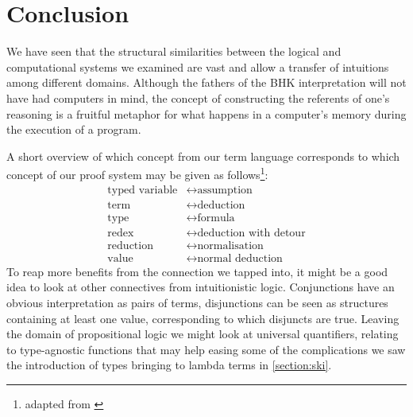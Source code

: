 \chapter{Conclusion}

We have seen that the structural similarities between the logical and
computational systems we examined are vast and allow a transfer of intuitions
among different domains. Although the fathers of the BHK interpretation will not
have had computers in mind, the concept of constructing the referents of one's
reasoning is a fruitful metaphor for what happens in a computer's memory during
the execution of a program.

A short overview of which concept from our term language corresponds to which
concept of our proof system may be given as follows\footnote{adapted from
\cite[67]{lectures}}:
\begin{align*}
\mbox{typed variable} &\leftrightarrow \mbox{assumption} \\
\mbox{term} &\leftrightarrow \mbox{deduction} \\
\mbox{type} &\leftrightarrow \mbox{formula} \\
\mbox{redex} &\leftrightarrow \mbox{deduction with detour} \\
\mbox{reduction} &\leftrightarrow \mbox{normalisation} \\
\mbox{value} &\leftrightarrow \mbox{normal deduction}
\end{align*}
To reap more benefits from the connection we tapped
into, it might be a good idea to look at other connectives from intuitionistic
logic. Conjunctions have an obvious interpretation as pairs of terms,
disjunctions can be seen as structures containing at least one value,
corresponding to which disjuncts are true. Leaving the domain of propositional
logic we might look at universal quantifiers, relating to type-agnostic
functions that may help easing some of the complications we saw the introduction
of types bringing to lambda terms in \ref{section:ski}.
